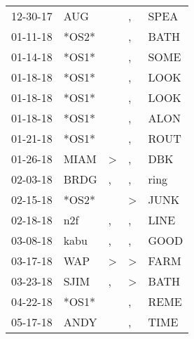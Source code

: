 \begin{supertabular}{p{0.07\textwidth}p{0.06\textwidth}p{0.02\textwidth}p{0.02\textwidth}p{0.06\textwidth}}
 12-30-17\textsuperscript{} &   AUG\textsuperscript{} &               &                , &  SPEA\textsuperscript{} \\
 01-11-18\textsuperscript{} &                   *OS2* &               &                , &  BATH\textsuperscript{} \\
 01-14-18\textsuperscript{} &                   *OS1* &               &                , &  SOME\textsuperscript{} \\
 01-18-18\textsuperscript{} &                   *OS1* &               &                , &  LOOK\textsuperscript{} \\
 01-18-18\textsuperscript{} &                   *OS1* &               &                , &  LOOK\textsuperscript{} \\
 01-18-18\textsuperscript{} &                   *OS1* &               &                , &  ALON\textsuperscript{} \\
 01-21-18\textsuperscript{} &                   *OS1* &               &                , &  ROUT\textsuperscript{} \\
 01-26-18\textsuperscript{} &  MIAM\textsuperscript{} &  \textgreater &                , &   DBK\textsuperscript{} \\
 02-03-18\textsuperscript{} &  BRDG\textsuperscript{} &             , &                , &  ring\textsuperscript{} \\
 02-15-18\textsuperscript{} &                   *OS2* &               &     \textgreater &  JUNK\textsuperscript{} \\
 02-18-18\textsuperscript{} &   n2f\textsuperscript{} &             , &                , &  LINE\textsuperscript{} \\
 03-08-18\textsuperscript{} &  kabu\textsuperscript{} &             , &                , &  GOOD\textsuperscript{} \\
 03-17-18\textsuperscript{} &   WAP\textsuperscript{} &  \textgreater &     \textgreater &  FARM\textsuperscript{} \\
 03-23-18\textsuperscript{} &  SJIM\textsuperscript{} &             , &     \textgreater &  BATH\textsuperscript{} \\
 04-22-18\textsuperscript{} &                   *OS1* &               &                , &  REME\textsuperscript{} \\
 05-17-18\textsuperscript{} &  ANDY\textsuperscript{} &               &                , &  TIME\textsuperscript{} \\

\end{supertabular}
